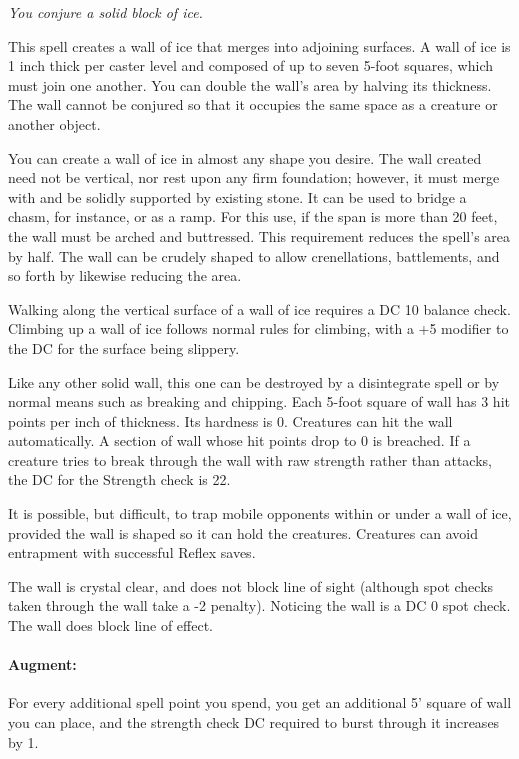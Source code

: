\emph{You conjure a solid block of ice.}

This spell creates a wall of ice that merges into adjoining surfaces. 
A wall of ice is 1 inch thick per caster level and composed of up to seven 5-foot squares, 
which must join one another. 
You can double the wall's area by halving its thickness. 
The wall cannot be conjured so that it occupies the same space as a creature or another object.

You can create a wall of ice in almost any shape you desire. 
The wall created need not be vertical, nor rest upon any firm foundation; however, 
it must merge with and be solidly supported by existing stone. 
It can be used to bridge a chasm, for instance, or as a ramp. 
For this use, if the span is more than 20 feet, the wall must be arched and buttressed. 
This requirement reduces the spell's area by half. 
The wall can be crudely shaped to allow crenellations, 
battlements, and so forth by likewise reducing the area.

Walking along the vertical surface of a wall of ice requires a DC 10 balance check.
Climbing up a wall of ice follows normal rules for climbing, with a +5 modifier
to the DC for the surface being slippery.

Like any other solid wall, this one can be destroyed by a disintegrate spell or by normal means such as breaking and chipping. 
Each 5-foot square of wall has 3 hit points per inch of thickness. Its hardness is 0.
Creatures can hit the wall automatically. 
A section of wall whose hit points drop to 0 is breached. 
If a creature tries to break through the wall with raw strength rather than attacks, 
the DC for the Strength check is 22.

It is possible, but difficult, to trap mobile opponents within or under a wall of ice, 
provided the wall is shaped so it can hold the creatures. 
Creatures can avoid entrapment with successful Reflex saves.

The wall is crystal clear, and does not block line of sight (although
spot checks taken through the wall take a -2 penalty).
Noticing the wall is a DC 0 spot check.
The wall does block line of effect.

\paragraph{Augment:} For every additional spell point you spend, you get an additional 5' square of wall you can place, 
and the strength check DC required to burst through it increases by 1.
